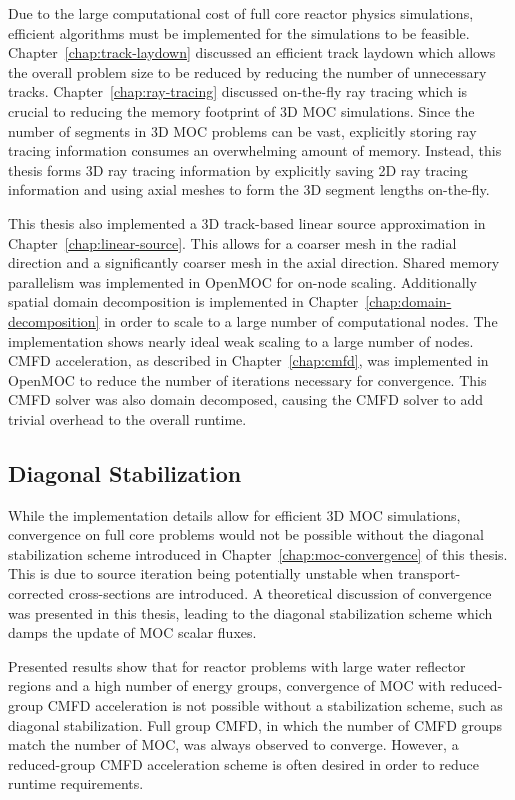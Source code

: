 Due to the large computational cost of full core reactor physics simulations, efficient algorithms must be implemented for the simulations to be feasible. Chapter~\ref{chap:track-laydown} discussed an efficient track laydown which allows the overall problem size to be reduced by reducing the number of unnecessary tracks. Chapter~\ref{chap:ray-tracing} discussed on-the-fly ray tracing which is crucial to reducing the memory footprint of 3D \ac{MOC} simulations. Since the number of segments in 3D \ac{MOC} problems can be vast, explicitly storing ray tracing information consumes an overwhelming amount of memory. Instead, this thesis forms 3D ray tracing information by explicitly saving 2D ray tracing information and using axial meshes to form the 3D segment lengths on-the-fly.

This thesis also implemented a 3D track-based linear source approximation in Chapter~\ref{chap:linear-source}. This allows for a coarser mesh in the radial direction and a significantly coarser mesh in the axial direction. Shared memory parallelism was implemented in OpenMOC for on-node scaling. Additionally spatial domain decomposition is implemented in Chapter~\ref{chap:domain-decomposition} in order to scale to a large number of computational nodes. The implementation shows nearly ideal weak scaling to a large number of nodes. \ac{CMFD} acceleration, as described in Chapter~\ref{chap:cmfd}, was implemented in OpenMOC to reduce the number of iterations necessary for convergence. This \ac{CMFD} solver was also domain decomposed, causing the \ac{CMFD} solver to add trivial overhead to the overall runtime.


\subsection{Diagonal Stabilization}
\label{sec:sub:diag-stab}

While the implementation details allow for efficient 3D \ac{MOC} simulations, convergence on full core problems would not be possible without the diagonal stabilization scheme introduced in Chapter~\ref{chap:moc-convergence} of this thesis. This is due to source iteration being potentially unstable when transport-corrected cross-sections are introduced. A theoretical discussion of convergence was presented in this thesis, leading to the diagonal stabilization scheme which damps the update of \ac{MOC} scalar fluxes.

Presented results show that for reactor problems with large water reflector regions and a high number of energy groups, convergence of \ac{MOC} with reduced-group \ac{CMFD} acceleration is not possible without a stabilization scheme, such as diagonal stabilization. Full group \ac{CMFD}, in which the number of \ac{CMFD} groups match the number of \ac{MOC}, was always observed to converge. However, a reduced-group \ac{CMFD} acceleration scheme is often desired in order to reduce runtime requirements.

